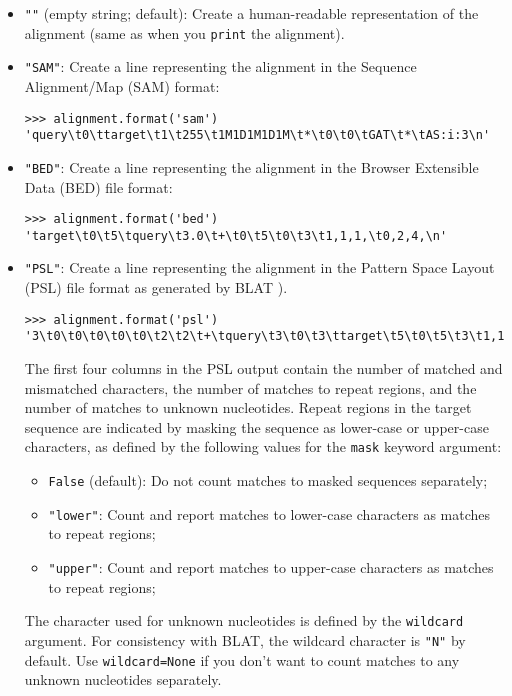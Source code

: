\begin{itemize}
\item \verb+""+ (empty string; default): Create a human-readable representation of the alignment (same as when you \verb+print+ the alignment).
\item \verb+"SAM"+: Create a line representing the alignment in the Sequence Alignment/Map (SAM) format:
\begin{verbatim}
>>> alignment.format('sam')
'query\t0\ttarget\t1\t255\t1M1D1M1D1M\t*\t0\t0\tGAT\t*\tAS:i:3\n'
\end{verbatim}
\item \verb+"BED"+: Create a line representing the alignment in the Browser Extensible Data (BED) file format:
\begin{verbatim}
>>> alignment.format('bed')
'target\t0\t5\tquery\t3.0\t+\t0\t5\t0\t3\t1,1,1,\t0,2,4,\n'
\end{verbatim}
\item \verb+"PSL"+: Create a line representing the alignment in the Pattern Space Layout (PSL) file format as generated by BLAT \cite{kent2002}).
\begin{verbatim}
>>> alignment.format('psl')
'3\t0\t0\t0\t0\t0\t2\t2\t+\tquery\t3\t0\t3\ttarget\t5\t0\t5\t3\t1,1,1,\t0,1,2,\t0,2,4,\n'
\end{verbatim}
The first four columns in the PSL output contain the number of matched and mismatched characters, the number of matches to repeat regions, and the number of matches to unknown nucleotides.
Repeat regions in the target sequence are indicated by masking the sequence as lower-case or upper-case characters, as defined by the following values for the \verb+mask+ keyword argument:
\begin{itemize}
\item \verb+False+ (default): Do not count matches to masked sequences separately;
\item \verb+"lower"+: Count and report matches to lower-case characters as matches to repeat regions;
\item \verb+"upper"+: Count and report matches to upper-case characters as matches to repeat regions;
\end{itemize}
The character used for unknown nucleotides is defined by the \verb+wildcard+ argument. For consistency with BLAT, the wildcard character is \verb+"N"+ by default. Use \verb+wildcard=None+ if you don't want to count matches to any unknown nucleotides separately.
\begin{verbatim}

\end{verbatim}
\end{itemize}
